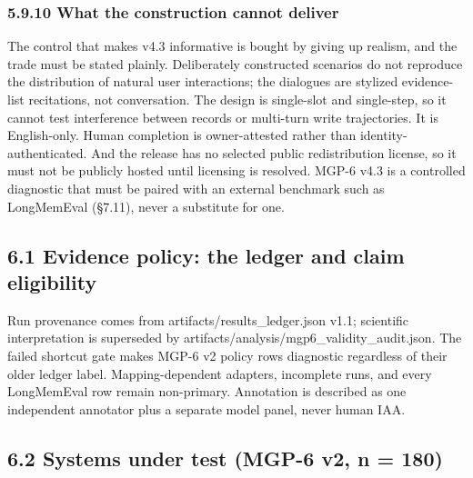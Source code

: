 \subsubsection{5.9.10 What the construction cannot
deliver}\label{what-the-construction-cannot-deliver}

The control that makes v4.3 informative is bought by giving up realism,
and the trade must be stated plainly. Deliberately constructed scenarios
do not reproduce the distribution of natural user interactions; the
dialogues are stylized evidence-list recitations, not conversation. The
design is single-slot and single-step, so it cannot test interference
between records or multi-turn write trajectories. It is English-only.
Human completion is owner-attested rather than identity-authenticated.
And the release has no selected public redistribution license, so it
must not be publicly hosted until licensing is resolved. MGP-6 v4.3 is a
controlled diagnostic that must be paired with an external benchmark
such as LongMemEval (§7.11), never a substitute for one.

\subsection{6.1 Evidence policy: the ledger and claim
eligibility}\label{evidence-policy-the-ledger-and-claim-eligibility}

Run provenance comes from artifacts/results\_ledger.json v1.1;
scientific interpretation is superseded by
artifacts/analysis/mgp6\_validity\_audit.json. The failed shortcut gate
makes MGP-6 v2 policy rows diagnostic regardless of their older ledger
label. Mapping-dependent adapters, incomplete runs, and every
LongMemEval row remain non-primary. Annotation is described as one
independent annotator plus a separate model panel, never human IAA.

\subsection{6.2 Systems under test (MGP-6 v2, n =
180)}\label{systems-under-test-mgp-6-v2-n-180}

